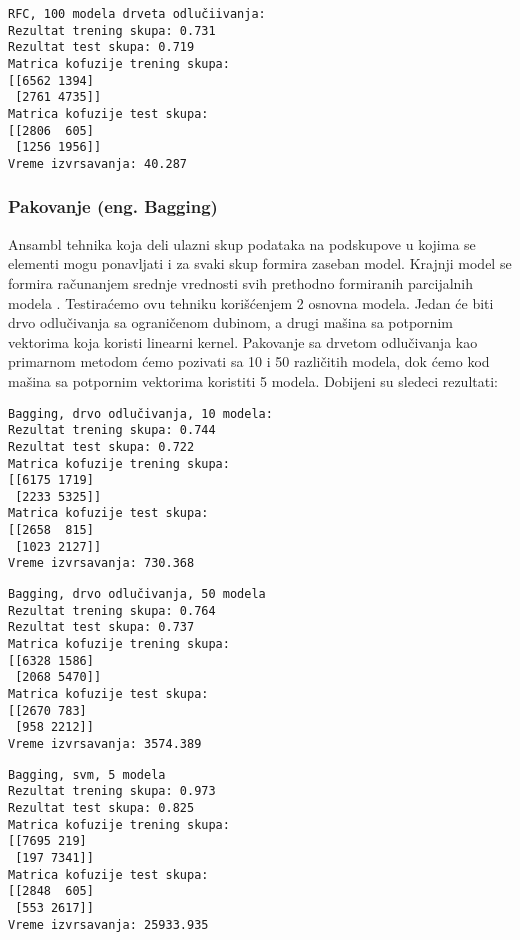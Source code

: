 \documentclass[a4paper]{article}
\begin{document}
\begin{tcolorbox}
\begin{verbatim}
RFC, 100 modela drveta odlučiivanja:
Rezultat trening skupa: 0.731
Rezultat test skupa: 0.719
Matrica kofuzije trening skupa:
[[6562 1394]
 [2761 4735]]
Matrica kofuzije test skupa:
[[2806  605]
 [1256 1956]]
Vreme izvrsavanja: 40.287
\end{verbatim}
\end{tcolorbox}


\subsubsection{Pakovanje (eng. Bagging)}
Ansambl tehnika koja deli ulazni skup podataka na podskupove u kojima se elementi
mogu ponavljati i za svaki skup formira zaseban model. Krajnji model se formira računanjem
srednje vrednosti svih prethodno formiranih parcijalnih modela \cite{Bagging}. Testiraćemo ovu tehniku
korišćenjem 2 osnovna modela. Jedan će biti drvo odlučivanja sa ograničenom dubinom, a drugi
mašina sa potpornim vektorima koja koristi linearni kernel.
Pakovanje sa drvetom odlučivanja kao primarnom metodom ćemo pozivati sa 10 i 50
različitih modela, dok ćemo kod mašina sa potpornim vektorima koristiti 5 modela.
Dobijeni su sledeci rezultati:


\begin{tcolorbox}
\begin{verbatim}
Bagging, drvo odlučivanja, 10 modela:
Rezultat trening skupa: 0.744
Rezultat test skupa: 0.722
Matrica kofuzije trening skupa:
[[6175 1719]
 [2233 5325]]
Matrica kofuzije test skupa:
[[2658  815]
 [1023 2127]]
Vreme izvrsavanja: 730.368
\end{verbatim}
\end{tcolorbox}

\begin{tcolorbox}
\begin{verbatim}
Bagging, drvo odlučivanja, 50 modela
Rezultat trening skupa: 0.764
Rezultat test skupa: 0.737
Matrica kofuzije trening skupa:
[[6328 1586]
 [2068 5470]]
Matrica kofuzije test skupa:
[[2670 783]
 [958 2212]]
Vreme izvrsavanja: 3574.389
\end{verbatim}
\end{tcolorbox}

\begin{tcolorbox}
\begin{verbatim}
Bagging, svm, 5 modela
Rezultat trening skupa: 0.973
Rezultat test skupa: 0.825
Matrica kofuzije trening skupa:
[[7695 219]
 [197 7341]]
Matrica kofuzije test skupa:
[[2848  605]
 [553 2617]]
Vreme izvrsavanja: 25933.935
\end{verbatim}
\end{tcolorbox}
\end{document}
